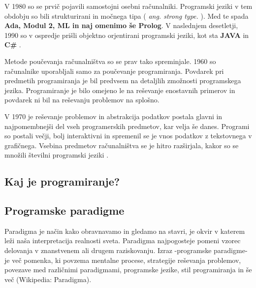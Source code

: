 V 1980 so se prvič pojavili samostojni osebni računalniki. Programski
jeziki v tem obdobju so bili strukturirani in močnega tipa (
\emph{ang.  strong type.} ). Med te spada \textbf{Ada, Modul 2, ML in
  naj omenimo še Prolog}. V naslednjem desetletji, 1990 so v ospredje
prišli objektno orjentirani programski jeziki, kot sta \textbf{JAVA}
in \textbf{C\#} \cite{thesisAWebP}.



Metode poučevanja računalništva so se prav tako spreminjale. 1960 so
računalnike uporabljali samo za poučevanje programiranja. Povdarek pri
predmetih programiranja je bil predvsem na detaljlih zmožnosti
programskega jezika. Programiranje je bilo omejeno le na reševanje
enostavnih primerov in povdarek ni bil na reševanju problemov na
splošno.

V 1970 je reševanje problemov in abstrakcija podatkov postala glavni
in najpomembnejši del vseh programerskih predmetov, kar velja še
danes.  Programi so postali večji, bolj interaktivni in spremenil se
je vnos podatkov z tekstovnega v grafičnega. Vsebina predmetov
računalništva se je hitro razširjala, kakor so se množili številni
programski jeziki \cite{thesisAWebP}.


\subsection{Kaj je programiranje?}
\label{sec:kaj_je_programiranje}


\subsection{Programske paradigme}
\label{sec:programske_paradigme}

Paradigma je način kako obravnavamo in gledamo na stavri, je okvir v
katerem leži naša interpretacija realnosti sveta. Paradigma
najpogosteje pomeni vzorec delovanja v znanstvenem ali drugem
raziskovanju.  Izraz -programske paradigme- je več pomenka, ki povzema
mentalne procese, strategije reševanja problemov, povezave med
različnimi paradigmami, programske jezike, stil programiranja in še
več (Wikipedia: Paradigma).


